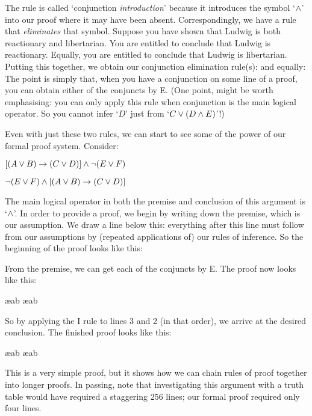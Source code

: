 The rule is called `conjunction \emph{introduction}' because it introduces the symbol `$\wedge$' into our proof where it may have been absent. Correspondingly, we have a rule that \emph{eliminates} that symbol.  Suppose you have shown that Ludwig is both reactionary and libertarian. You are entitled to conclude that Ludwig is reactionary. Equally, you are entitled to conclude that Ludwig is libertarian. Putting this together, we obtain our conjunction elimination rule(s):
and equally:
The point is simply that, when you have a conjunction on some line of a proof, you can obtain either of the conjuncts by {\eand}E. (One point, might be worth emphasising: you can only apply this rule when conjunction is the main logical operator. So you cannot infer `$D$' just from `$C \vee (D \wedge E)$'!)

Even with just these two rules, we can start to see some of the power of our formal proof system. Consider:
\begin{earg}
\item[] $[(A\vee B)\rightarrow(C\vee D)] \wedge \neg(E\vee F)$
\item[\therefore] $\neg(E\vee F) \wedge [(A\vee B)\rightarrow(C\vee D)]$
\end{earg}
The main logical operator in both the premise and conclusion of this argument is `$\wedge$'. In order to provide a proof, we begin by writing down the premise, which is our assumption. We draw a line below this: everything after this line must follow from our assumptions by (repeated applications of) our rules of inference. So the beginning of the proof looks like this:
\begin{pf}
\end{pf}
From the premise, we can get each of the conjuncts by {\eand}E. The proof now looks like this:
\begin{pf}
	 \ae{ab}
	 \ae{ab}
\end{pf}
So by applying the {\eand}I rule to lines 3 and 2 (in that order), we arrive at the desired conclusion. The finished proof looks like this:
\begin{pf}

	 \ae{ab}
	 \ae{ab}
	 
\end{pf}
This is a very simple proof, but it shows how we can chain rules of proof together into longer proofs. In passing, note that investigating this argument with a truth table would have required a staggering 256 lines; our formal proof required only four lines. 

